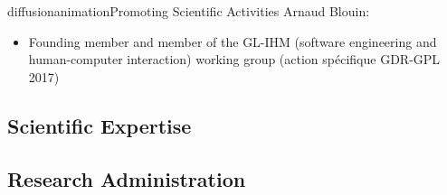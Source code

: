 \documentclass{ra2018}
\begin{document}
\begin{module}{diffusion}{animation}{Promoting Scientific Activities}
\noindent Arnaud Blouin:
\begin{itemize}
	\item Founding member and member of the GL-IHM (software engineering and human-computer interaction) working group (action spécifique GDR-GPL 2017)
\end{itemize}

\subsection{Scientific Expertise}



\subsection{Research Administration}
  
\end{module}
\end{document}
